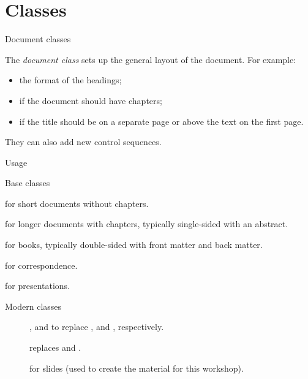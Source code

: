 
\section{Classes}

\begin{frame}{Document classes}

  The \emph{document class} sets up the general layout of the document.
  For example:
  \begin{itemize}
	\item the format of the headings;
	\item if the document should have chapters;
	\item if the title should be on a separate page or above the text on the first page.
  \end{itemize}
  They can also add new control sequences.

  \begin{block}{Usage}
  \end{block}
\end{frame}

\begin{frame}{Base classes}

  \begin{description}
	\item[] for short documents without chapters.
	\item[] for longer documents with chapters, typically single-sided with an abstract.
	\item[] for books, typically double-sided with front matter and back matter.
	\item<2->[\cls{letter}] for correspondence.
	\item<2->[\cls{slides}] for presentations.
  \end{description}

\end{frame}

\begin{frame}{Modern classes}

  \begin{description}
	\item[] ,  and  to replace , 
	and , respectively.
	\item[] replaces  and .
	\item[] for slides (used to create the material for this workshop).
  \end{description}

\end{frame}

